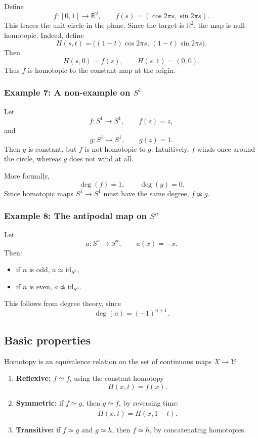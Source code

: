 \documentclass[12pt,a4paper]{article}
\theoremstyle{notespace}
\begin{document}
Define
\[
f:[0,1]\to\mathbb R^2,
\qquad
f(s)=(\cos 2\pi s,\sin 2\pi s).
\]
This traces the unit circle in the plane. Since the target is \(\mathbb R^2\), the map is null-homotopic. Indeed, define
\[
H(s,t)=\big((1-t)\cos 2\pi s,\,(1-t)\sin 2\pi s\big).
\]
Then
\[
H(s,0)=f(s),
\qquad
H(s,1)=(0,0).
\]
Thus \(f\) is homotopic to the constant map at the origin.

\subsubsection{Example 7: A non-example on \(S^1\)}

Let
\[
f:S^1\to S^1,\qquad f(z)=z,
\]
and
\[
g:S^1\to S^1,\qquad g(z)=1.
\]
Then \(g\) is constant, but \(f\) is not homotopic to \(g\). Intuitively, \(f\) winds once around the circle, whereas \(g\) does not wind at all.

More formally,
\[
\deg(f)=1,
\qquad
\deg(g)=0.
\]
Since homotopic maps \(S^1\to S^1\) must have the same degree, \(f\not\simeq g\).

\subsubsection{Example 8: The antipodal map on \(S^n\)}

Let
\[
a:S^n\to S^n,\qquad a(x)=-x.
\]
Then:
\begin{itemize}
	\item if \(n\) is odd, \(a\simeq \mathrm{id}_{S^n}\),
	\item if \(n\) is even, \(a\not\simeq \mathrm{id}_{S^n}\).
\end{itemize}
This follows from degree theory, since
\[
\deg(a)=(-1)^{n+1}.
\]

\subsection{Basic properties}

Homotopy is an equivalence relation on the set of continuous maps \(X\to Y\):

\begin{enumerate}
	\item \textbf{Reflexive:} \(f\simeq f\), using the constant homotopy
	\[
	H(x,t)=f(x).
	\]
	
	\item \textbf{Symmetric:} if \(f\simeq g\), then \(g\simeq f\), by reversing time:
	\[
	\widetilde H(x,t)=H(x,1-t).
	\]
	
	\item \textbf{Transitive:} if \(f\simeq g\) and \(g\simeq h\), then \(f\simeq h\), by concatenating homotopies.
\end{enumerate}
\end{document}
